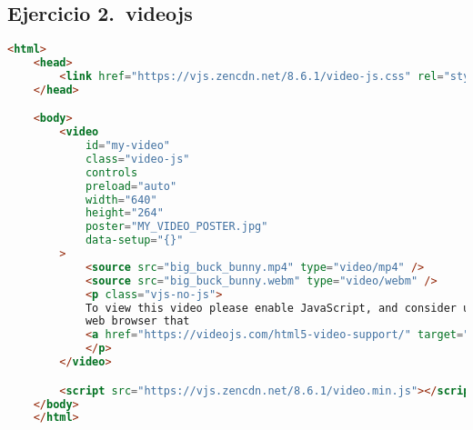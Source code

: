 \subsection{Ejercicio 2.~videojs}
\begin{lstlisting}[language=html]
	<html>
	<head>
		<link href="https://vjs.zencdn.net/8.6.1/video-js.css" rel="stylesheet" />
	</head>

	<body>
		<video
			id="my-video"
			class="video-js"
			controls
			preload="auto"
			width="640"
			height="264"
			poster="MY_VIDEO_POSTER.jpg"
			data-setup="{}"
		>
			<source src="big_buck_bunny.mp4" type="video/mp4" />
			<source src="big_buck_bunny.webm" type="video/webm" />
			<p class="vjs-no-js">
			To view this video please enable JavaScript, and consider upgrading to a
			web browser that
			<a href="https://videojs.com/html5-video-support/" target="_blank">supports HTML5 video</a>
			</p>
		</video>

		<script src="https://vjs.zencdn.net/8.6.1/video.min.js"></script>
	</body>
	</html>
\end{lstlisting}
